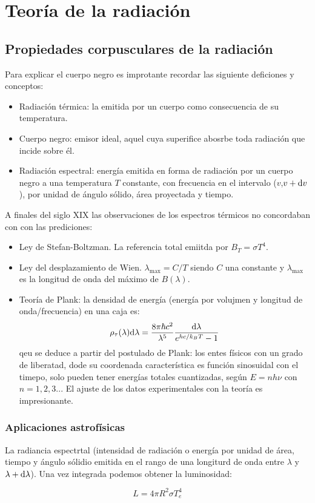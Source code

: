 

\chapter{Teoría de la radiación}

\section{Propiedades corpusculares de la radiación}

Para explicar el cuerpo negro es improtante recordar las siguiente deficiones y conceptos: 

\begin{itemize}
    \item Radiación térmica: la emitida por un cuerpo como consecuencia de su temperatura.
    \item Cuerpo negro: emisor ideal, aquel cuya superifice abosrbe toda radiación que incide sobre él.
    \item Radiación espectral: energía emitida en forma de radiación por un cuerpo negro a una temperatura $T$ constante, con frecuencia en el intervalo ($v$,$v+\mathrm{d} v$), por unidad de ángulo sólido, área proyectada y tiempo. 
\end{itemize}
A finales del siglo XIX las observaciones de los espectros térmicos no concordaban con con las prediciones:

\begin{itemize}
    \item Ley de Stefan-Boltzman. La referencia total emiitda por $B_T = \sigma T^4$. 
    \item Ley del desplazamiento de Wien. $\lambda_{\max} = C / T$ siendo $C$ una constante y $\lambda_{\max}$ es la longitud de onda del máximo de $B(\lambda)$. 
    \item Teoría de Plank: la densidad de energía (energía por volujmen y longitud de onda/frecuencia) en una caja es:
    \begin{equation}
        \rho_\tau (\lambda) \mathrm{d} \lambda = \frac{8 \pi \hbar c^2}{\lambda^5} \frac{\mathrm{d} \lambda}{e^{hc/k_BT}-1}
    \end{equation}
    qeu se deduce a partir del postulado de Plank: los entes físicos con un grado de liberatad, dode su coordenada característica es función sinosuidal con el timepo, solo pueden tener energías totales cuantizadas, según $E=n h \nu$ con $n=1,2,3...$ El ajuste de los datos experimentales con la teoría es impresionante. 
\end{itemize}

\subsection{Aplicaciones astrofísicas}

La radiancia espectrtal (intensidad de radiación o energía por unidad de área, tiempo y ángulo sólidio emitida en el rango de una longiturd de onda entre $\lambda$ y $\lambda + \mathrm{d} \lambda$). Una vez integrada podemos obtener la luminosidad:

\begin{equation}
    L = 4 \pi R^2 \sigma T^4_e
\end{equation}